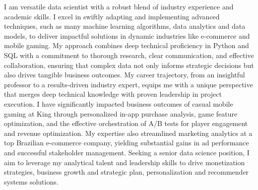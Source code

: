 

I am versatile data scientist with a robust blend of industry experience and academic skills.
I excel in swiftly adapting and implementing advanced techniques, 
such as many machine learning algorithms, data analytics and data models, 
to deliver impactful solutions in dynamic industries like e-commerce and mobile gaming. 
My approach combines deep technical proficiency in Python and SQL with a commitment to thorough research, 
clear communication, and effective collaboration, 
ensuring that complex data not only informs strategic decisions but also drives tangible business outcomes.
My career trajectory, from an insightful professor to a results-driven industry expert, 
equips me with a unique perspective that merges deep technical knowledge with proven leadership in project execution.
I have significantly impacted business outcomes 
of casual mobile gaming at King
through personalized in-app purchase analysis, 
game feature optimization, and the effective orchestration of A/B tests for player engagement and revenue optimization.
My expertise also streamlined marketing analytics at a top Brazilian e-commerce company, 
yielding substantial gains in ad performance and successful stakeholder management.
Seeking a senior data science position, I aim to leverage my analytical talent and leadership skills to 
drive monetization strategies, business growth and strategic plan, personalization and recommender systems solutions. 
